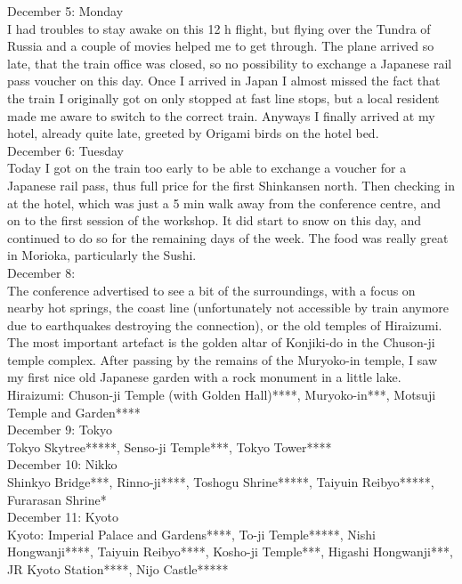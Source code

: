 December 5: Monday\\
I had troubles to stay awake on this 12 h flight, but flying over the Tundra of Russia and a couple of movies helped me to get through. The plane arrived so late, that the train office was closed, so no possibility to exchange a Japanese rail pass voucher on this day. Once I arrived in Japan I almost missed the fact that the train I originally got on only stopped at fast line stops, but a local resident made me aware to switch to the correct train. Anyways I finally arrived at my hotel, already quite late, greeted by Origami birds on the hotel bed.\\

December 6: Tuesday\\
Today I got on the train too early to be able to exchange a voucher for a Japanese rail pass, thus full price for the first Shinkansen north. Then checking in at the hotel, which was just a 5 min walk away from the conference centre, and on to the first session of the workshop. It did start to snow on this day, and continued to do so for the remaining days of the week. The food was really great in Morioka, particularly the Sushi.\\

December 8:\\
The conference advertised to see a bit of the surroundings, with a focus on nearby hot springs, the coast line (unfortunately not accessible by train anymore due to earthquakes destroying the connection), or the old temples of Hiraizumi. The most important artefact is the golden altar of Konjiki-do in the Chuson-ji temple complex. After passing by the remains of the Muryoko-in temple, I saw my first nice old Japanese garden with a rock monument in a little lake.\\

Hiraizumi: Chuson-ji Temple (with Golden Hall)****, Muryoko-in***, Motsuji Temple and Garden****\\

December 9: Tokyo\\
Tokyo Skytree*****, Senso-ji Temple***, Tokyo Tower****\\

December 10: Nikko\\
Shinkyo Bridge***, Rinno-ji****, Toshogu Shrine*****, Taiyuin Reibyo*****, Furarasan Shrine*\\

December 11: Kyoto\\
Kyoto: Imperial Palace and Gardens****, To-ji Temple*****, Nishi Hongwanji****, Taiyuin Reibyo****, Kosho-ji Temple***, Higashi Hongwanji***, JR Kyoto Station****, Nijo Castle*****\\

